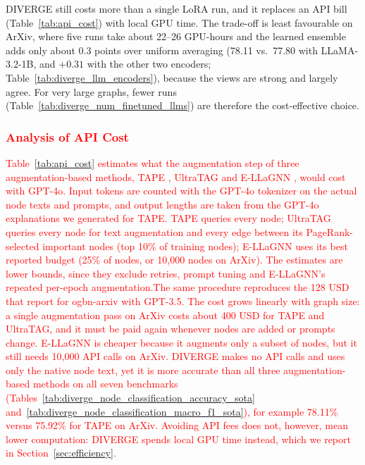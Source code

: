 \documentclass[a4paper,fleqn]{cas-sc}
\newcommand{\revone}[1]{\textcolor{red}{#1}}   %
\DeclareRobustCommand{\revcommon}[2][]{\textcolor{revshared}{#2}} %
\begin{document}
\revcommon[R1,R2,R4]{DIVERGE still costs more than a single LoRA run, and it replaces an API bill (Table~\ref{tab:api_cost}) with local GPU time. The trade-off is least favourable on ArXiv, where five runs take about 22--26 GPU-hours and the learned ensemble adds only about 0.3 points over uniform averaging (78.11 vs.\ 77.80 with LLaMA-3.2-1B, and $+0.31$ with the other two encoders; Table~\ref{tab:diverge_llm_encoders}), because the views are strong and largely agree. For very large graphs, fewer runs (Table~\ref{tab:diverge_num_finetuned_llms}) are therefore the cost-effective choice.}

\subsubsection{\revone{Analysis of API Cost}}\label{sec:api_cost}

\revone{Table~\ref{tab:api_cost} estimates what the augmentation step of three augmentation-based methods, TAPE \citep{he2024harnessing}, UltraTAG \citep{yu2025ultratag} and E-LLaGNN \citep{Jaiswal2024AllAgainstSome}, would cost with GPT-4o. Input tokens are counted with the GPT-4o tokenizer on the actual node texts and prompts, and output lengths are taken from the GPT-4o explanations we generated for TAPE. TAPE queries every node; UltraTAG queries every node for text augmentation and every edge between its PageRank-selected important nodes (top 10\% of training nodes); E-LLaGNN uses its best reported budget (25\% of nodes, or 10{,}000 nodes on ArXiv). The estimates are lower bounds, since they exclude retries, prompt tuning and E-LLaGNN's repeated per-epoch augmentation.The same procedure reproduces the 128 USD that \citet{he2024harnessing} report for ogbn-arxiv with GPT-3.5. The cost grows linearly with graph size: a single augmentation pass on ArXiv costs about 400 USD for TAPE and UltraTAG, and it must be paid again whenever nodes are added or prompts change. E-LLaGNN is cheaper because it augments only a subset of nodes, but it still needs 10{,}000 API calls on ArXiv. DIVERGE makes no API calls and uses only the native node text, yet it is more accurate than all three augmentation-based methods on all seven benchmarks (Tables~\ref{tab:diverge_node_classification_accuracy_sota} and~\ref{tab:diverge_node_classification_macro_f1_sota}), for example 78.11\% versus 75.92\% for TAPE on ArXiv. Avoiding API fees does not, however, mean lower computation: DIVERGE spends local GPU time instead, which we report in Section~\ref{sec:efficiency}.}
\end{document}
